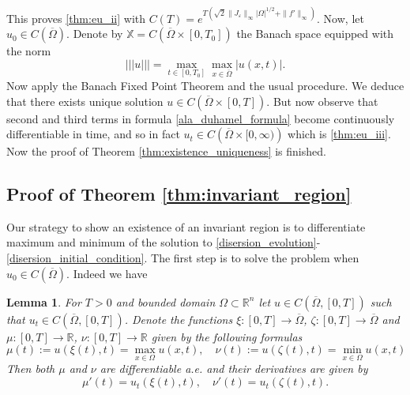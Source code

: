\documentclass[12pt, a4paper]{article}
\theoremstyle{break}
\theoremstyle{break}
\theoremstyle{break}
\theoremstyle{break}
\newtheorem{lem}{Lemma}[section]
\theoremstyle{break}
\begin{document}
This proves \ref{thm:eu_ii} with $C(T) = e^{T \left( \sqrt{2}\|J_\varepsilon\|_\infty |\Omega|^{1/2} + \|f'\|_\infty \right)}$. Now, let $u_0 \in C(\overline{\Omega})$. Denote by $\mathbb{X} = C\left(\overline{\Omega} \times [0, T_0]\right)$ the Banach space equipped with the norm
\begin{equation*}
    ||| u ||| = \max_{t \in [0, T_0]} \max_{x \in \overline{\Omega}} |u(x,t)|.
\end{equation*}
Now apply the Banach Fixed Point Theorem and the usual procedure. We deduce that there exists unique solution $u \in C\left( \overline{\Omega} \times [0, T] \right)$. But now observe that second and third terms in formula \eqref{ala_duhamel_formula} become continuously differentiable in time, and so in fact $u_t \in C\left( \overline{\Omega} \times [0, \infty) \right)$ which is \ref{thm:eu_iii}. Now the proof of Theorem \ref{thm:existence_uniqueness} is finished.

\subsection{Proof of Theorem \ref{thm:invariant_region}}

Our strategy to show an existence of an invariant region is to differentiate maximum and minimum of the solution to \eqref{disersion_evolution}-\eqref{disersion_initial_condition}. The first step is to solve the problem when $u_0 \in C(\overline{\Omega})$. Indeed we have

\begin{lem}
    For $T > 0$ and bounded domain $\Omega \subset \mathbb{R}^n$ let $u \in C\left(\overline{\Omega}, [0, T]\right)$ such that $u_t \in C\left(\overline{\Omega}, [0, T]\right)$. Denote the functions $\xi: [0, T] \rightarrow \overline{\Omega}$, $\zeta: [0, T] \rightarrow \overline{\Omega}$ and $\mu: [0, T] \rightarrow \mathbb{R}$, $\nu: [0, T] \rightarrow \mathbb{R}$ given by the following formulas
    \begin{equation}
        \mu(t) := u(\xi(t), t) = \max_{x \in \Omega} u(x,t), \quad \nu(t) := u(\zeta(t), t) = \min_{x \in \Omega} u(x,t)
        \label{mu_nu_xi_zeta_formula}
    \end{equation}
    Then both $\mu$ and $\nu$ are differentiable a.e. and their derivatives are given by
    \begin{equation}
        \mu'(t) = u_t(\xi(t), t), \quad \nu'(t) = u_t(\zeta(t), t).
        \label{mu_nu_derivatives_formula}
    \end{equation} 
    \label{lem:mu_nu_differentiability}
\end{lem}
\end{document}
